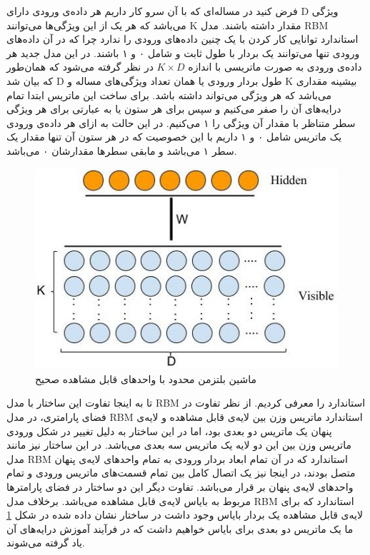 فرض کنید در مساله‌ای‌ که با آن سرو کار داریم هر داده‌ی ورودی دارای
D
ویژگی‌ می‌‌باشد که هر یک از این ویژگی‌ها می‌‌توانند 
K
مقدار داشته باشند. مدل
RBM
استاندارد توانایی کار کردن با یک چنین داده‌های ورودی را ندارد چرا که در آن داده‌های ورودی تنها می‌‌توانند یک بردار با طول ثابت و شامل ۰ و ۱ باشند. در این مدل جدید هر داده‌ی ورودی به صورت ماتریسی با اندازه
$K \times D$
در نظر گرفته می‌شود که همان‌طور که بیان شد
D
طول بردار ورودی یا همان تعداد ویژگی‌های مساله و
K
بیشینه مقداری می‌‌باشد که هر ویژگی‌ می‌‌تواند داشته باشد. برای ساخت این ماتریس ابتدا تمام درایه‌های آن را صفر می‌‌کنیم و سپس برای هر ستون یا به عبارتی برای هر ویژگی‌ سطر متناظر با مقدار آن ویژگی‌ را ۱ می‌‌کنیم. در این حالت به ازای هر داده‌ی ورودی یک ماتریس شامل ۰ و ۱ داریم با این خصوصیت که در هر ستون آن تنها مقدار یک سطر  ۱ می‌‌باشد و مابقی سطرها مقدارشان ۰ می‌‌باشد.
\begin{figure}[!t]
	\centering
	\includegraphics[scale=0.5]{chap4-img/MRBM}
	\caption{ماشین بلتزمن محدود با واحدهای قابل مشاهده صحیح}
	\label{chap4-fig2}
\end{figure}

تا به اینجا تفاوت این ساختار با مدل
RBM
استاندارد را معرفی‌ کردیم. از نظر تفاوت در فضای پارامتری، در مدل
RBM
استاندارد ماتریس وزن بین لایه‌ی قابل مشاهده و لایه‌ی پنهان یک ماتریس دو بعدی بود، اما در این ساختار به دلیل تغییر در شکل ورودی ماتریس وزن بین این دو لایه یک ماتریس سه بعدی می‌‌باشد. در این ساختار نیز مانند مدل
RBM
استاندارد که در آن تمام ابعاد بردار ورودی به تمام واحد‌های لایه‌ی پنهان متصل بودند، در اینجا نیز یک اتصال کامل بین تمام قسمت‌های ماتریس ورودی و تمام واحد‌های لایه‌ی پنهان بر قرار می‌‌باشد. تفاوت دیگر این دو ساختار در فضای پارامتر‌ها مربوط به بایاس لایه‌ی قابل مشاهده می‌‌باشد. برخلاف مدل
RBM
استاندارد که برای لایه‌ی قابل مشاهده یک بردار بایاس وجود داشت در ساختار نشان داده شده در شکل
\ref{chap4-fig2}
ما یک ماتریس دو بعدی برای بایاس خواهیم داشت که در فرآیند آموزش درایه‌های آن یاد گرفته می‌‌شوند.

